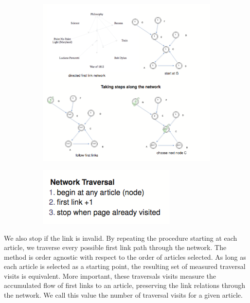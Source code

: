\documentclass[twoside]{article}
\newcommand{\red}[1]{{\leavevmode\color{sred}{#1}}} %
\begin{document}
\begin{figure}[H]
\centering
    \caption{traversing the network}
\begin{subfigure}[b]{0.8\textwidth}
    \includegraphics[width=\textwidth]{graphics/traverse_algo.png}
\end{subfigure}
\end{figure}

\red{[[explain with better diagram]]}

\begin{figure}[H]
\centering
    \caption{traverse procedure}
\begin{subfigure}[b]{0.3\textwidth}
    \includegraphics[width=\textwidth]{graphics/traverse_procedure.png}
\end{subfigure}
\end{figure}

We also stop if the link is invalid. 
By repeating the procedure starting at each article, we traverse
every possible first link path through the network.
The method is order agnostic with respect to the order of articles selected.
As long as each article is selected as a starting point, the resulting set of measured traversal visits is equivalent. 
More important, these traversals visits measure the accumulated flow of first 
links to an article, preserving the link relations through the network.
We call this value the number of traversal visits for a given article.
\end{document}
